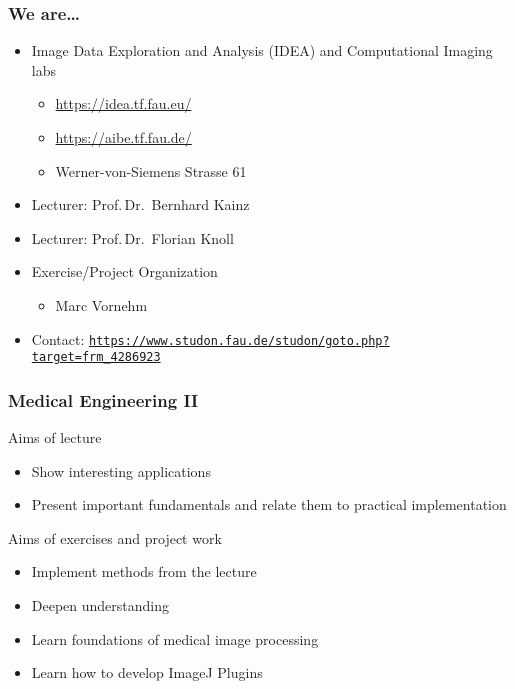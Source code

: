 

\subtitle{Motivation}




\nocite{*}

\frame[plain,c]{\titlepage} %

\begin{frame}
	\frametitle{We are\ldots}
	\begin{itemize}
		\setlength\itemsep{0.5cm}
		\item Image Data Exploration and Analysis (IDEA) and Computational Imaging labs
		      \begin{itemize}
			      \item \url{https://idea.tf.fau.eu/}
			      \item \url{https://aibe.tf.fau.de/}
			      \item Werner-von-Siemens Strasse 61
		      \end{itemize}
		\item Lecturer: Prof.\,Dr.\ Bernhard Kainz
		\item Lecturer: Prof.\,Dr.\ Florian Knoll
		\item Exercise/Project Organization
		      \begin{itemize}
			      \item Marc Vornehm
		      \end{itemize}
		\item Contact: \texttt{\url{https://www.studon.fau.de/studon/goto.php?target=frm_4286923}}
	\end{itemize}
\end{frame}

\begin{frame}
	\frametitle{Medical Engineering II}
	\begin{block}{Aims of lecture}
		\begin{itemize}
			\item Show interesting applications
			\item Present important fundamentals and relate them to practical
			      implementation
		\end{itemize}
	\end{block}
	\begin{block}{Aims of exercises and project work}
		\begin{itemize}
			\item Implement methods from the lecture
			\item Deepen understanding
			\item Learn foundations of medical image processing
			\item Learn how to develop ImageJ Plugins
		\end{itemize}
	\end{block}
\end{frame}

